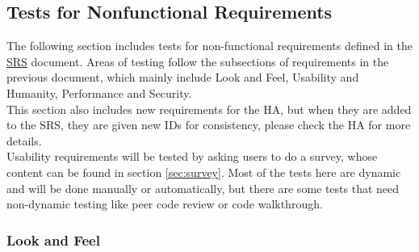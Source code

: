 \documentclass[12pt, titlepage]{article}
\begin{document}
\subsection{Tests for Nonfunctional Requirements}
\label{sec:nonfunctional}

The following section includes tests for non-functional requirements defined in the \href{https://github.com/beatlepie/4G06CapstoneProjectTeam2/blob/main/docs/SRS/SRS.pdf}{SRS} document. Areas of testing follow the subsections of requirements in the previous document, which mainly include Look and Feel, Usability and Humanity, Performance and Security.\\ 
This section also includes new requirements for the HA, but when they are added to the SRS, they are given new IDs for consistency, please check the HA for more details. \\
Usability requirements will be tested by asking users to do a survey, whose content can be found in section \ref{sec:survey}. Most of the tests here are dynamic and will be done manually or automatically, but there are some tests that need non-dynamic testing like peer code review or code walkthrough.

\subsubsection{Look and Feel}
\end{document}
